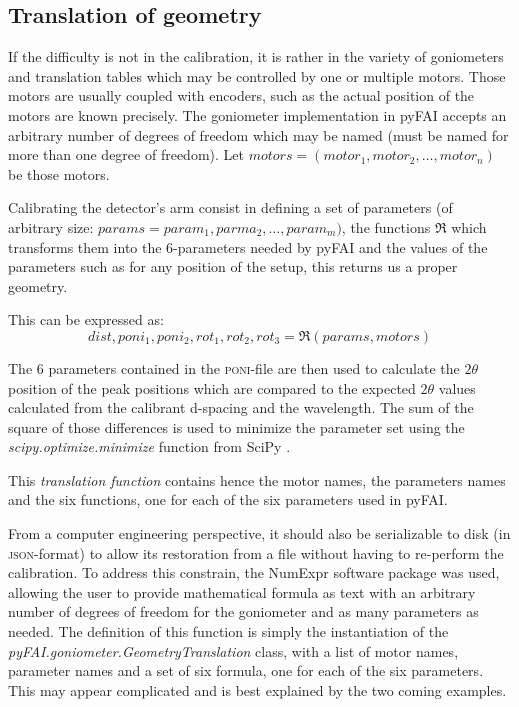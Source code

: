 \documentclass[preprint, pdf]{iucr}              %
\begin{document}
\subsection{Translation of geometry}

If the difficulty is not in the calibration, it is  rather in the variety of
goniometers and translation tables which may be controlled by one or multiple
motors.
Those motors are usually coupled with encoders, such as the actual position of
the motors are known precisely.
The goniometer implementation in pyFAI accepts an
arbitrary number of degrees of freedom which may be named
(must be named for more than one degree of freedom).
Let $motors = (motor_1, motor_2, \ldots, motor_n)$ be those motors.

Calibrating the detector's arm consist in defining a set of parameters
(of arbitrary size: $params = param_1, parma_2, \ldots, param_m)$, the
functions $\Re$ which transforms them into the 6-parameters needed by pyFAI and
the values of the parameters such as for any position of the setup, this returns
us a proper geometry.

This can be expressed as:
$$
dist, poni_1, poni_2, rot_1, rot_2, rot_3 = \Re(params, motors) $$

The 6 parameters contained in the \textsc{poni}-file  are then used to calculate
the $2\theta$ position of the peak positions which are compared to the expected $2\theta$
values calculated from the calibrant d-spacing and the wavelength.
The sum of the square of those differences is used to minimize the parameter set
using the \textit{scipy.optimize.minimize} function from SciPy \cite{scipy}.

This \textit{translation function} contains hence the motor names, the
parameters names and the six functions, one for each of the six parameters used in pyFAI.

From a computer engineering perspective, it should also be serializable to
disk (in \textsc{json}-format) to allow its restoration from a file without
having to re-perform the calibration.
To address this constrain, the NumExpr software package \cite{numexpr} was
used, allowing the user to provide mathematical formula as text with an
arbitrary number of degrees of freedom for the goniometer and as many parameters
as needed.
The definition of this function is simply the instantiation of the
\textit{pyFAI.goniometer.GeometryTranslation} class, with a list of motor
names, parameter names and a set of six formula, one for each of the six parameters.
This may appear complicated and is best explained by the two coming examples.
\end{document}
